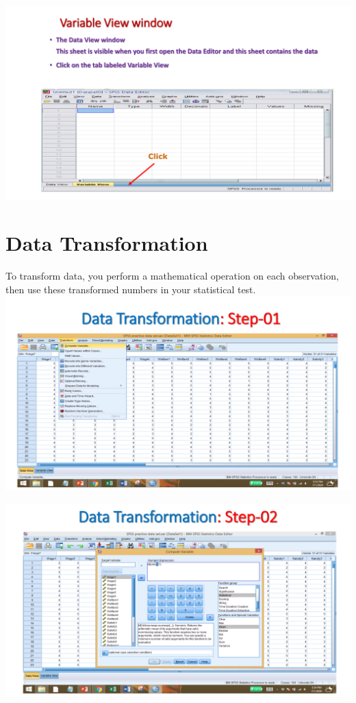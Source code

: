 \documentclass[
  letterpaper,
  DIV=11,
  numbers=noendperiod]{scrreprt}
\begin{document}
\includegraphics{images/slides/img_Page_014.png}


\chapter{Data Transformation}\label{data-transformation}

To transform data, you perform a mathematical operation on each
observation, then use these transformed numbers in your statistical
test.\\

\includegraphics{images/slides/img_Page_016.png}

\includegraphics{images/slides/img_Page_017.png}
\end{document}
